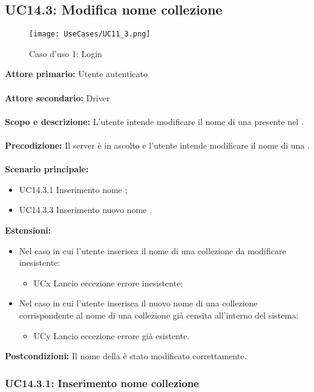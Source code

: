 \documentclass{scalatekids-article}
\begin{document}
\subsection{UC14.3: Modifica nome collezione}
\begin{figure}[H]
  \begin{center}
    \texttt{[image: UseCases/UC11\_3.png]}
    \caption*{Caso d'uso 1: Login}
  \end{center}
\end{figure}
\textbf{Attore primario:} Utente autenticato\\ \\
\textbf{Attore secondario:} Driver\\ \\
\textbf{Scopo e descrizione:} L’utente intende modificare il nome di una  presente nel .\\ \\
\textbf{Precodizione:} Il server è in ascolto e l’utente intende modificare il nome di una .\\ \\
\textbf{Scenario principale:}
\begin{itemize}
\item UC14.3.1 Inserimento nome ;
\item UC14.3.3 Inserimento nuovo nome .
\end{itemize}
\textbf{Estensioni:}
\begin{itemize}
\item Nel caso in cui l'utente inserisca il nome di una collezione da modificare inesistente:
  \begin{itemize}
  \item UCx Lancio eccezione errore  inesistente;
  \end{itemize}
\item Nel caso in cui l'utente inserisca il nuovo nome di una collezione corrispondente al nome di una collezione già censita all'interno del sistema:
  \begin{itemize}
  \item UCy Lancio eccezione errore  già esistente.
  \end{itemize}
\end{itemize}
\textbf{Postcondizioni:} Il nome della  è stato modificato correttamente.

\subsubsection{UC14.3.1: Inserimento nome collezione}
\end{document}
